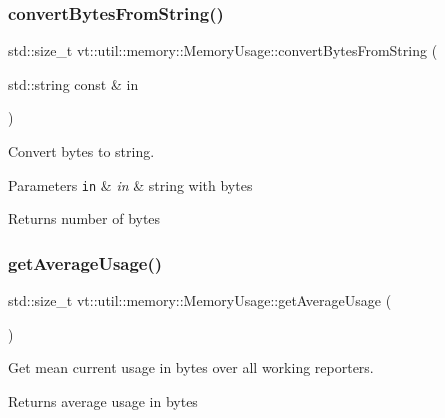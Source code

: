 \subsubsection{\texorpdfstring{convert\+Bytes\+From\+String()}{convertBytesFromString()}}
{\footnotesize\ttfamily std\+::size\+\_\+t vt\+::util\+::memory\+::\+Memory\+Usage\+::convert\+Bytes\+From\+String (\begin{DoxyParamCaption}\item[{std\+::string const \&}]{in }\end{DoxyParamCaption})}



Convert bytes to string. 


\begin{DoxyParams}[1]{Parameters}
\mbox{\tt in}  & {\em in} & string with bytes\\
\hline
\end{DoxyParams}
\begin{DoxyReturn}{Returns}
number of bytes 
\end{DoxyReturn}
\mbox{\label{structvt_1_1util_1_1memory_1_1_memory_usage_a59d87ec931fe37d4300ba72b00e63d8e}} 
\subsubsection{\texorpdfstring{get\+Average\+Usage()}{getAverageUsage()}}
{\footnotesize\ttfamily std\+::size\+\_\+t vt\+::util\+::memory\+::\+Memory\+Usage\+::get\+Average\+Usage (\begin{DoxyParamCaption}{ }\end{DoxyParamCaption})}



Get mean current usage in bytes over all working reporters. 

\begin{DoxyReturn}{Returns}
average usage in bytes 
\end{DoxyReturn}
\mbox{\label{structvt_1_1util_1_1memory_1_1_memory_usage_a5baf0fd6bf753755c4602fcb91a7c268}} 
